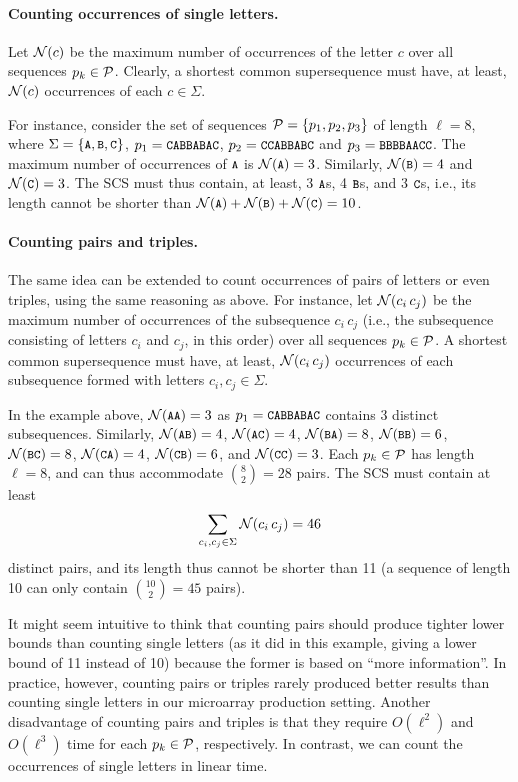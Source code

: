 \paragraph{Counting occurrences of single letters.}
Let ${\mathcal{N}}(c)$ be the maximum number of occurrences of the letter $c$ over all
sequences $p_k \in {\mathcal{P}}$. Clearly, a shortest common supersequence must
have, at least, ${\mathcal{N}}(c)$ occurrences of each $c \in \Sigma$.

For instance, consider the set of sequences ${\mathcal{P}} = \{p_1, p_2, p_3 \}$ of
length $\ell = 8$, where $\Sigma = \{\text{\small{\tt A}},\text{\small{\tt B}},\text{\small{\tt C}} \}$, $p_1 = {\text{\small{\tt{CABBABAC}}}}$,
$p_2 = {\text{\small{\tt{CCABBABC}}}}$ and $p_3 = {\text{\small{\tt{BBBBAACC}}}}$. The maximum number of
occurrences of $\text{\small{\tt A}}$ is ${\mathcal{N}}(\text{\small{\tt A}})=3$. Similarly, ${\mathcal{N}}(\text{\small{\tt B}})=4$ and
${\mathcal{N}}(\text{\small{\tt C}})=3$. The SCS must thus contain, at least, 3 $\text{\small{\tt A}}$s, 4 $\text{\small{\tt B}}$s, and 3
$\text{\small{\tt C}}$s, i.e., its length cannot be shorter than
${\mathcal{N}}(\text{\small{\tt A}}) + {\mathcal{N}}(\text{\small{\tt B}}) + {\mathcal{N}}(\text{\small{\tt C}}) = 10$.

\paragraph{Counting pairs and triples.}

The same idea can be extended to count occurrences of pairs of letters or even triples,
using the same reasoning as above. For instance, let
${\mathcal{N}}(c_i \, c_j)$ be the maximum number of occurrences of the subsequence
$c_i \, c_j$ (i.e., the subsequence consisting of letters $c_i$ and $c_j$, in
this order) over all sequences $p_k \in {\mathcal{P}}$. A shortest common
supersequence must have, at least, ${\mathcal{N}}(c_i \, c_j)$ occurrences of each
subsequence formed with letters $c_i, c_j \in \Sigma$.

In the example above, ${\mathcal{N}}({\text{\small{\tt{AA}}}}) = 3$ as $p_1 = {\text{\small{\tt{CABBABAC}}}}$ contains 3
distinct  subsequences. Similarly, ${\mathcal{N}}({\text{\small{\tt{AB}}}}) = 4$,
${\mathcal{N}}({\text{\small{\tt{AC}}}}) = 4$, ${\mathcal{N}}({\text{\small{\tt{BA}}}}) = 8$, ${\mathcal{N}}({\text{\small{\tt{BB}}}}) = 6$,
${\mathcal{N}}({\text{\small{\tt{BC}}}}) = 8$, ${\mathcal{N}}({\text{\small{\tt{CA}}}}) = 4$, ${\mathcal{N}}({\text{\small{\tt{CB}}}}) = 6$, and
${\mathcal{N}}({\text{\small{\tt{CC}}}}) = 3$. Each $p_k \in {\mathcal{P}}$ has length $\ell = 8$,
and can thus accommodate ${8 \choose 2} = 28$ pairs. The SCS must contain
at least
\[
\sum_{c_i, c_j \in \Sigma} {\mathcal{N}}(c_i \, c_j) = 46
\]
distinct pairs, and its length thus cannot be shorter than 11 (a sequence of
length 10 can only contain ${10 \choose 2} = 45$ pairs).

It might seem intuitive to think that counting pairs should produce tighter
lower bounds than counting single letters (as it did in this example, giving a
lower bound of 11 instead of 10) because the former is based on ``more
information''. In practice, however, counting pairs or triples rarely produced
better results than counting single letters in our microarray production
setting. Another disadvantage of counting pairs and triples is that they require
$O(\ell^2)$ and $O(\ell^3)$ time for each $p_k \in {\mathcal{P}}$, respectively. In
contrast, we can count the occurrences of single letters in linear time.

